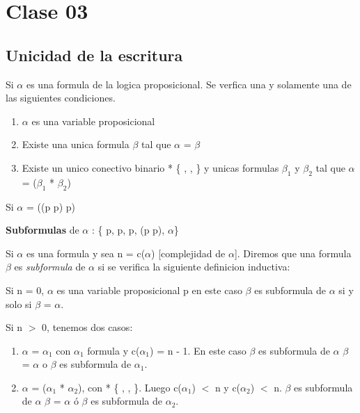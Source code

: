 \section{Clase 03}

\subsection{Unicidad de la escritura}

Si $\alpha$ es una formula de la logica proposicional. Se verfica una y solamente una de las siguientes condiciones.

\begin{enumerate}
	\item $\alpha$ es una variable proposicional
	\item Existe una unica formula $\beta$ tal que $\alpha$ = \cneg $\beta$
	\item Existe un unico conectivo binario * \cin \{ \cland, \clor, \then \} y unicas formulas $\beta_1$ y $\beta_2$ tal que $\alpha$ = ($\beta_1$ * $\beta_2$) 
\end{enumerate}

\begin{example}
Si $\alpha$ = ((p \then p) \clor p)

\textbf{Subformulas} de $\alpha$ : \{ p, p, p, (p \then p), $\alpha$\}
\end{example}

\begin{definition}
Si $\alpha$ es una formula y sea n = c($\alpha$) [complejidad de $\alpha$]. Diremos que una formula $\beta$ es \textit{subformula} de $\alpha$ si se verifica la siguiente definicion inductiva:

Si n = 0, $\alpha$ es una variable proposicional p en este caso $\beta$ es subformula de $\alpha$ si y solo si $\beta$ = $\alpha$.

Si n $>$ 0, tenemos dos casos:

\begin{enumerate}
	\item $\alpha$ = \cneg $\alpha_1$ con $\alpha_1$ formula y c($\alpha_1$) = n - 1. En este 		caso $\beta$ es subformula de $\alpha$ \ciff $\beta$ = $\alpha$ o $\beta$ es subformula de 
	$\alpha_1$.
	\item $\alpha$ = ($\alpha_1$ * $\alpha_2$), con * \{ \cland, \clor, \then \}. Luego c($			\alpha_1$) $<$ n y c($\alpha_2$) $<$ n. $\beta$ es subformula de $\alpha$ \ciff $\beta$ = $		\alpha$ ó $\beta$ es subformula de $\alpha_2$.
\end{enumerate}
\end{definition}

